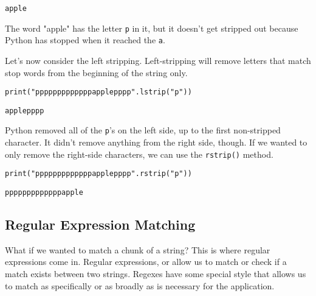 \begin{lstlisting}[style=none]
apple
\end{lstlisting}
The word "apple" has the letter \verb|p| in it, but it doesn't get stripped out because Python has stopped when it reached the \verb|a|.\par
Let's now consider the left stripping. Left-stripping will remove letters that match stop words from the beginning of the string only.\par
\begin{lstlisting}[style=pippython]
print("pppppppppppppapplepppp".lstrip("p"))
\end{lstlisting}
\begin{lstlisting}[style=none]
applepppp
\end{lstlisting}
Python removed all of the \verb|p|'s on the left side, up to the first non-stripped character. It didn't remove anything from the right side, though. If we wanted to only remove the right-side characters, we can use the \verb|rstrip()| method.\par
\begin{lstlisting}[style=pippython]
print("pppppppppppppapplepppp".rstrip("p"))
\end{lstlisting}
\begin{lstlisting}[style=none]
pppppppppppppapple
\end{lstlisting}
\subsection{Regular Expression Matching}
What if we wanted to match a chunk of a string? This is where regular expressions come in. Regular expressions, or  allow us to match or check if a match exists between two strings. Regexes have some special style that allows us to match as specifically or as broadly as is necessary for the application.\par
